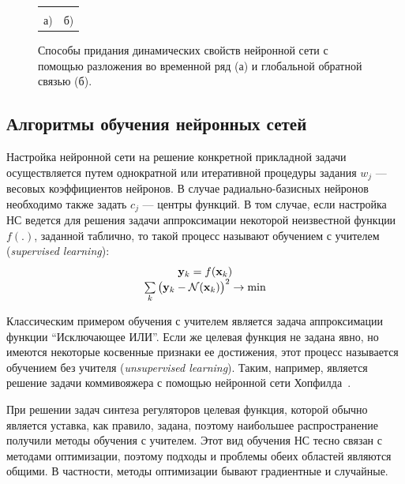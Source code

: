 \begin{figure}[h]
\centering
\begin{tabular}{cc}
\hbox{} &
\hbox{} \\
а) & б)\\
\end{tabular}
\caption{Способы придания динамических свойств нейронной сети с помощью
         разложения во временной ряд (а)
         и глобальной обратной связью (б).}
\label{fig:dynamic_nn}
\end{figure}



\subsection{Алгоритмы обучения нейронных сетей}\label{nn_learning_algorithms}

Настройка нейронной сети на решение конкретной прикладной задачи
осуществляется путем однократной или итеративной процедуры задания
$w_j$ --- весовых коэффициентов нейронов.  В случае радиально-базисных
нейронов необходимо также задать $c_j$ --- центры функций.  В том
случае, если настройка НС ведется для решения задачи аппроксимации
некоторой неизвестной функции $f(.)$, заданной таблично, то такой
процесс называют обучением с учителем ({\em supervised learning}):
\begin{equation}\label{eq:supervised_learning_task}
  \begin{array}{c}
    \mathbf{y}_k=f(\mathbf{x}_k)\\
    \sum\limits_k\big(\mathbf{y}_k-\NN(\mathbf{x}_k)\big)^2\rightarrow\min
  \end{array}
\end{equation}

Классическим примером обучения с учителем является задача
аппроксимации функции ``Исключающее ИЛИ''.  Если же целевая функция не
задана явно, но имеются некоторые косвенные признаки ее достижения,
этот процесс называется обучением без учителя ({\em unsupervised
  learning}).  Таким, например, является решение задачи коммивояжера с
помощью нейронной сети Хопфилда~\cite{wasser92}.

При решении задач синтеза регуляторов целевая функция, которой обычно
является уставка, как правило, задана, поэтому наибольшее
распространение получили методы обучения с учителем.  Этот вид
обучения НС тесно связан с методами оптимизации, поэтому подходы и
проблемы обеих областей являются общими.  В частности, методы
оптимизации бывают градиентные и случайные.

